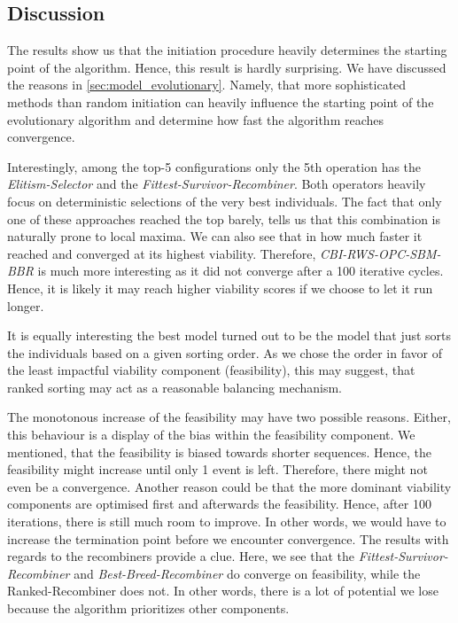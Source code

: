 \documentclass[./../../paper.tex]{subfiles}
\begin{document}
\subsection{Discussion}

The results show us that the initiation procedure heavily determines the starting point of the algorithm. Hence, this result is hardly surprising. We have discussed the reasons in \autoref{sec:model_evolutionary}. Namely, that more sophisticated methods than random initiation can heavily influence the starting point of the evolutionary algorithm and determine how fast the algorithm reaches convergence. 

Interestingly, among the top-5 configurations only the 5th operation has the \emph{Elitism-Selector} and the \emph{Fittest-Survivor-Recombiner}. Both operators heavily focus on deterministic selections of the very best individuals. The fact that only one of these approaches reached the top barely, tells us that this combination is naturally prone to local maxima. We can also see that in how much faster it reached and converged at its highest viability. Therefore, \emph{CBI-RWS-OPC-SBM-BBR} is much more interesting as it did not converge after a 100 iterative cycles. Hence, it is likely it may reach higher viability scores if we choose to let it run longer.

It is equally interesting the best model turned out to be the model that just sorts the individuals based on a given sorting order. As we chose the order in favor of the least impactful viability component (feasibility), this may suggest, that ranked sorting may act as a reasonable balancing mechanism. 

The monotonous increase of the feasibility may have two possible reasons. Either, this behaviour is a display of the bias within the feasibility component. We mentioned, that the feasibility is biased towards shorter sequences. Hence, the feasibility might increase until only 1 event is left. Therefore, there might not even be a convergence. Another reason could be that the more dominant viability components are optimised first and afterwards the feasibility. Hence, after 100 iterations, there is still much room to improve. In other words, we would have to increase the termination point before we encounter convergence. The results with regards to the recombiners provide a clue. Here, we see that the \emph{Fittest-Survivor-Recombiner} and \emph{Best-Breed-Recombiner} do converge on feasibility, while the {Ranked-Recombiner} does not. In other words, there is a lot of potential we lose because the algorithm prioritizes other components. 
\end{document}
